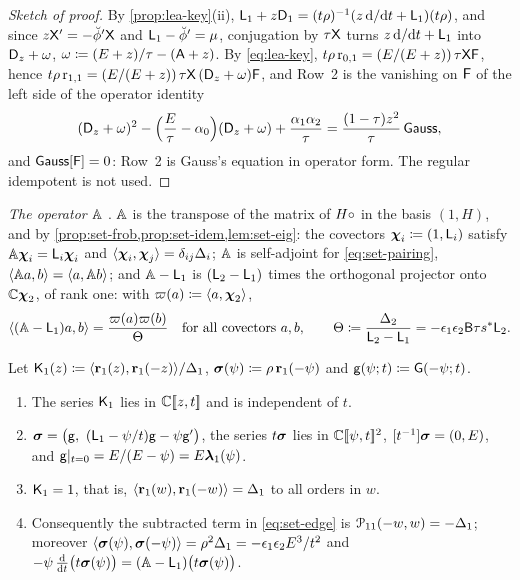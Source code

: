 \begin{proof}[Sketch of proof]
By \cref{prop:lea-key}(ii), $\mathsf{L}_1+z\mathsf{D}_1=(t\rho)^{-1}(z\,\mathrm{d}/\mathrm{d} t+\mathsf{L}_1)(t\rho)$, and since $z\mathsf{X}'=-\breve{\phi}'\mathsf{X}$ and $\mathsf{L}_1-\breve{\phi}'=\mu$, conjugation by $\tau\mathsf{X}$ turns $z\,\mathrm{d}/\mathrm{d} t+\mathsf{L}_1$ into $\mathsf{D}_{z}+\omega$, $\omega\coloneqq(E+z)/\tau-(\mathsf{A}+z)$. By \eqref{eq:lea-key}, $t\rho\,\mathrm{r}_{0,1}=(E/(E+z))\,\tau\mathsf{X}\mathsf{F}$, hence $t\rho\,\mathrm{r}_{1,1}=(E/(E+z))\,\tau\mathsf{X}\,(\mathsf{D}_{z}+\omega)\mathsf{F}$, and Row~2 is the vanishing on $\mathsf{F}$ of the left side of the operator identity 
\[
(\mathsf{D}_{z}+\omega)^2-\Big(\frac{E}{\tau}-\alpha_0\Big)(\mathsf{D}_{z}+\omega)+\frac{\alpha_1\alpha_2}{\tau}=\frac{(1-\tau)z^2}{\tau}\,\mathsf{Gauss} ,
\]
and $\mathsf{Gauss}[\mathsf{F}]=0$: Row~2 is Gauss's equation in operator form. The regular idempotent is not used.
\end{proof}

\emph{The operator $\mathbb{A}$} . $\mathbb{A}$ is the transpose of the matrix of $H\circ$ in the basis $(1,H)$, and by \cref{prop:set-frob,prop:set-idem,lem:set-eig}: the covectors $\boldsymbol{\chi}_i\coloneqq(1,\mathsf{L}_i)$ satisfy $\mathbb{A}\boldsymbol{\chi}_i=\mathsf{L}_i\boldsymbol{\chi}_i$ and $\langle\boldsymbol{\chi}_i,\boldsymbol{\chi}_j\rangle=\delta_{ij}\Delta_i$; $\mathbb{A}$ is self-adjoint for \eqref{eq:set-pairing}, $\langle\mathbb{A} a,b\rangle=\langle a,\mathbb{A} b\rangle$; and $\mathbb{A}-\mathsf{L}_1$ is $(\mathsf{L}_2-\mathsf{L}_1)$ times the orthogonal projector onto $\mathbb{C}\boldsymbol{\chi}_2$, of rank one: with $\varpi(a)\coloneqq\langle a,\boldsymbol{\chi}_2\rangle$,
\begin{equation}
\label{eq:lea-proj}
\langle(\mathbb{A}-\mathsf{L}_1)a,b\rangle=\frac{\varpi(a)\varpi(b)}{\Theta}\quad\text{for all covectors }a,b,\qquad
\Theta\coloneqq\frac{\Delta_2}{\mathsf{L}_2-\mathsf{L}_1}=-\epsilon_1\epsilon_2\mathsf{B}\tau s^{\ast}\mathsf{L}_2 .
\end{equation}

\begin{prop}[{\Lref{Proposition~4.9}: the symplectic constant $\Kone=1$}]
\label{prop:lea-K1}
Let $\mathsf{K}_{1}(z)\coloneqq\langle\mathbf{r}_1(z),\mathbf{r}_1(-z)\rangle/\Delta_1$, $\boldsymbol{\sigma}(\psi)\coloneqq\rho\,\mathbf{r}_1(-\psi)$ and $\mathsf{g}(\psi;t)\coloneqq\mathsf{G}(-\psi;t)$.
\begin{enumerate}
\item The series $\mathsf{K}_{1}$ lies in $\mathbb{C}[\![ z,t ]\!]$ and is independent of $t$.
\item $\brow=\big(\gl,\ (\Lv_1-\psi/t)\gl-\psi\gl'\big)$, the series $t\boldsymbol{\sigma}$ lies in $\mathbb{C}[\![ \psi,t ]\!]^2$, $[t^{-1}]\boldsymbol{\sigma}=(0,E)$, and $\mathsf{g}|_{t=0}=E/(E-\psi)=E\boldsymbol{\lambda}_1(\psi)$.
\item $\Kone=1$, that is, $\langle\mathbf{r}_1(w),\mathbf{r}_1(-w)\rangle=\Delta_1$ to all orders in $w$.
\item Consequently the subtracted term in \eqref{eq:set-edge} is $\mathcal{P}_{11}(-w,w)=-\Delta_1$; moreover $\langle\boldsymbol{\sigma}(\psi),\boldsymbol{\sigma}(-\psi)\rangle=\rho^2\Delta_1=-\epsilon_1\epsilon_2E^3/t^2$ and $-\psi\,\frac{\mathrm{d}}{\mathrm{d} t}\big(t\boldsymbol{\sigma}(\psi)\big)=(\mathbb{A}-\mathsf{L}_1)\big(t\boldsymbol{\sigma}(\psi)\big)$.
\end{enumerate}
\end{prop}

